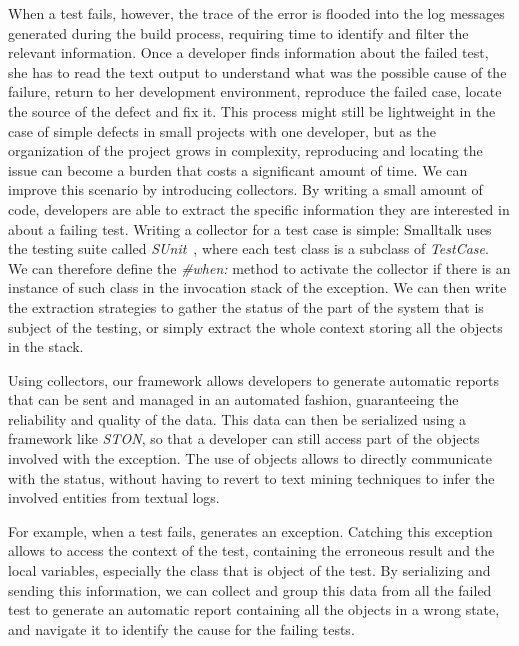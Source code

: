 When a test fails, however, the trace of the error is flooded into the log messages generated during the build process, requiring time to identify and filter the relevant information. Once a developer finds information about the failed test, she has to read the text output to understand what was the possible cause of the failure, return to her development environment, reproduce the failed case, locate the source of the defect and fix it.
This process might still be lightweight in the case of simple defects in small projects with one developer, but as the organization of the project grows in complexity, reproducing and locating the issue can become a burden that costs a significant amount of time. We can improve this scenario by introducing \sln collectors.
By writing a small amount of code, developers are able to extract the specific information they are interested in about a failing test. Writing a collector for a test case is simple: Smalltalk uses the testing suite called \textit{SUnit}~\cite{Beck1994a}, where each test class is a subclass of \textit{TestCase}.
We can therefore define the \textit{\#when:} method to activate the collector if there is an instance of such class in the invocation stack of the exception.
We can then write the extraction strategies to gather the status of the part of the system that is subject of the testing, or simply extract the whole context storing all the objects in the stack.

Using collectors, our framework allows developers to generate automatic reports that can be sent and managed in an automated fashion, guaranteeing the reliability and quality of the data. This data can then be serialized using a framework like \textit{STON}, so that a developer can still access part of the objects involved with the exception.
The use of objects allows to directly communicate with the status, without having to revert to text mining techniques to infer the involved entities from textual logs.

For example, when a test fails,  generates an  exception.
Catching this exception allows to access the context of the test, containing the erroneous result and the local variables, especially the class that is object of the test.
By serializing and sending this information, we can collect and group this data from all the failed test to generate an automatic report containing all the objects in a wrong state, and navigate it to identify the cause for the failing tests.

